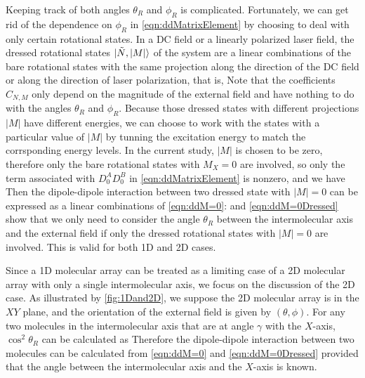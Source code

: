 Keeping track of both angles $\theta_{R}$ and $\phi_{R}$ is complicated. Fortunately, we can get rid of the 
dependence on $\phi_{R}$ in \autoref{eqn:ddMatrixElement} by choosing to deal with only certain rotational states.  
In a DC field or a linearly polarized laser field, the dressed rotational states $| \Tilde{N}, |M| \rangle$ of the
system are a linear combinations of the bare rotational states with the same projection along the direction of the DC field 
or along the direction of laser polarization, that is,
Note that the coefficients $C_{N, M}$ only depend on the magnitude of the external field and have nothing to do  
with the angles $\theta_{R}$ and $\phi_{R}$. 
Because those dressed states with different 
projections $|M|$ have different energies, we can choose to work with the states with a particular value of $|M|$ 
by tunning the excitation energy to match the corrsponding energy levels. 
In the current study, 
$|M|$ is chosen to be zero, therefore only the bare rotational states with $M_X = 0$ are involved, so only the
term associated with $D_0^A D_0^B$ in  \autoref{eqn:ddMatrixElement} is nonzero, and we have
Then the dipole-dipole interaction between two dressed state with $|M| = 0$ can be expressed as a linear combinations of \autoref{eqn:ddM=0}:
 and \autoref{eqn:ddM=0Dressed} show that we only need to consider the angle $\theta_{R}$
between the intermolecular axis and the external field if only the dressed rotational states with $|M|=0$ are
 involved. This is valid for both 1D and 2D cases.  

Since a 1D molecular array can be treated as a limiting case of a 2D molecular array with only a single intermolecular
 axis, we focus on the discussion of the 2D case. As illustrated by \autoref{fig:1Dand2D}, we suppose the 2D molecular 
array is in the $XY$ plane, and the orientation of the external field is given by $(\theta, \phi)$. For any two 
molecules in the intermolecular axis that are at angle $\gamma$ with the $X$-axis, $\cos^2\theta_{R}$ 
 can be calculated as
Therefore the dipole-dipole interaction between two molecules can be calculated from \autoref{eqn:ddM=0} and
 \autoref{eqn:ddM=0Dressed} provided that the angle between the intermolecular axis and the $X$-axis is known. 


